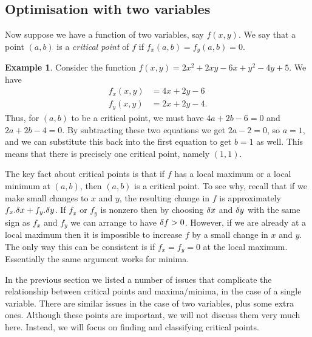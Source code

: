 \documentclass[reqno]{amsart}
\theoremstyle{definition}
\newtheorem{example}[theorem]{Example}
\begin{document}
\subsection{Optimisation with two variables}
\label{subsec-opt-two}

Now suppose we have a function of two variables, say $f(x,y)$.  We say
that a point $(a,b)$ is a \emph{critical point} of $f$ if
$f_x(a,b)=f_y(a,b)=0$.  

\begin{example}
 Consider the function $f(x,y)=2x^2+2xy-6x+y^2-4y+5$.  We have
 \begin{align*}
  f_x(x,y) &= 4x+2y-6 \\
  f_y(x,y) &= 2x+2y-4.
 \end{align*}
 Thus, for $(a,b)$ to be a critical point, we must have $4a+2b-6=0$
 and $2a+2b-4=0$.  By subtracting these two equations we get $2a-2=0$,
 so $a=1$, and we can substitute this back into the first equation to
 get $b=1$ as well.  This means that there is precisely one critical
 point, namely $(1,1)$. 
\end{example}

The key fact about critical points is that if $f$ has a local maximum
or a local minimum at $(a,b)$, then $(a,b)$ is a critical point.  To
see why, recall that if we make small changes to $x$ and $y$, the
resulting change in $f$ is approximately $f_x.\delta x+f_y.\delta y$.  If
$f_x$ or $f_y$ is nonzero then by choosing $\delta x$ and $\delta y$ with
the same sign as $f_x$ and $f_y$ we can arrange to have $\delta f>0$.
However, if we are already at a local maximum then it is impossible to
increase $f$ by a small change in $x$ and $y$.  The only way this can
be consistent is if $f_x=f_y=0$ at the local maximum.  Essentially the
same argument works for minima.  

In the previous section we listed a number of issues that complicate
the relationship between critical points and maxima/minima, in the
case of a single variable.  There are similar issues in the case of
two variables, plus some extra ones.  Although these points are
important, we will not discuss them very much here.  Instead, we will
focus on finding and classifying critical points.
\end{document}
